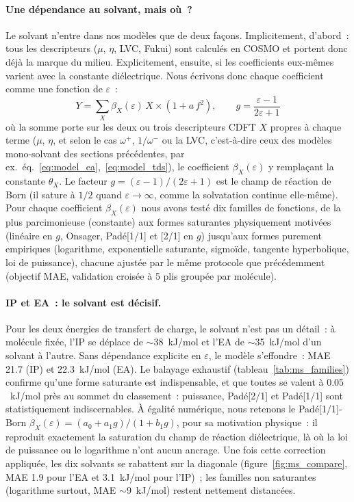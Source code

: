 \paragraph{Une dépendance au solvant, mais où~?}
Le solvant n'entre dans nos modèles que de deux façons. Implicitement, d'abord~: tous les descripteurs ($\mu$, $\eta$, LVC, Fukui) sont calculés en COSMO et portent donc déjà la marque du milieu. Explicitement, ensuite, si les coefficients eux-mêmes varient avec la constante diélectrique. Nous écrivons donc chaque coefficient comme une fonction de $\varepsilon$~:
\begin{equation}
Y = \sum_X \beta_X(\varepsilon)\, X \times (1 + a\, f^2), \qquad
g = \frac{\varepsilon - 1}{2\varepsilon + 1}
\label{eq:beta_eps}
\end{equation}
où la somme porte sur les deux ou trois descripteurs CDFT $X$ propres à chaque terme ($\mu$, $\eta$, et selon le cas $\omega^+$, $1/\omega^-$ ou la LVC, c'est-à-dire ceux des modèles mono-solvant des sections précédentes, par ex.\ éq.~\ref{eq:model_ea},~\ref{eq:model_tds}), le coefficient $\beta_X(\varepsilon)$ y remplaçant la constante $\theta_X$. Le facteur $g = (\varepsilon - 1)/(2\varepsilon + 1)$ est le champ de réaction de Born (il sature à $1/2$ quand $\varepsilon \to \infty$, comme la solvatation continue elle-même). Pour chaque coefficient $\beta_X(\varepsilon)$ nous avons testé dix familles de fonctions, de la plus parcimonieuse (constante) aux formes saturantes physiquement motivées (linéaire en $g$, Onsager, Padé[1/1] et [2/1] en $g$) jusqu'aux formes purement empiriques (logarithme, exponentielle saturante, sigmoïde, tangente hyperbolique, loi de puissance), chacune ajustée par le même protocole que précédemment (objectif MAE, validation croisée à 5 plis groupée par molécule).

\paragraph{IP et EA~: le solvant est décisif.}
Pour les deux énergies de transfert de charge, le solvant n'est pas un détail~: à molécule fixée, l'IP se déplace de $\sim$\SI{38}{kJ/mol} et l'EA de $\sim$\SI{35}{kJ/mol} d'un solvant à l'autre. Sans dépendance explicite en $\varepsilon$, le modèle s'effondre~: MAE \SI{21.7}{} (IP) et \SI{22.3}{kJ/mol} (EA). Le balayage exhaustif (tableau~\ref{tab:ms_families}) confirme qu'une forme saturante est indispensable, et que toutes se valent à $0.05$~kJ/mol près au sommet du classement~: puissance, Padé[2/1] et Padé[1/1] sont statistiquement indiscernables. À égalité numérique, nous retenons le Padé[1/1]-Born $\beta_X(\varepsilon) = (a_0 + a_1 g)/(1 + b_1 g)$, pour sa motivation physique~: il reproduit exactement la saturation du champ de réaction diélectrique, là où la loi de puissance ou le logarithme n'ont aucun ancrage. Une fois cette correction appliquée, les dix solvants se rabattent sur la diagonale (figure~\ref{fig:ms_compare}, MAE \SI{1.9}{} pour l'EA et \SI{3.1}{kJ/mol} pour l'IP)~; les familles non saturantes (logarithme surtout, MAE $\sim$\SI{9}{kJ/mol}) restent nettement distancées.

